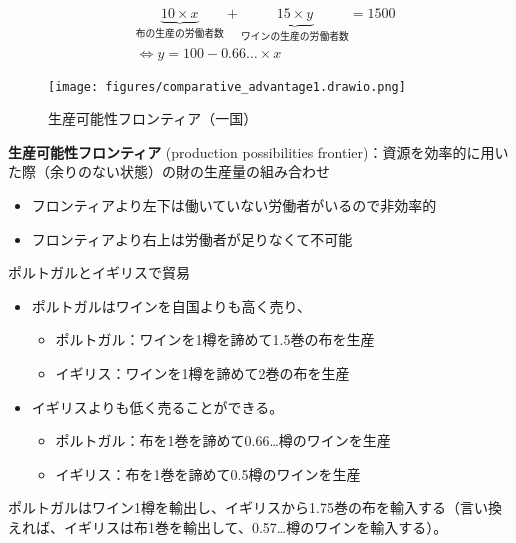 \documentclass[
  xelatex,
  ja=standard]{bxjsarticle}
\providecommand{\tightlist}{%
  \setlength{\itemsep}{0pt}\setlength{\parskip}{0pt}}\usepackage{longtable,booktabs,array}
\begin{document}
\[
\begin{split}
& \underbrace{10 \times x}_{\textrm{布の生産の労働者数}} + \underbrace{15 \times y}_{\textrm{ワインの生産の労働者数}} = 1500 \\
& \Leftrightarrow y = 100 - 0.66 \dots \times x
\end{split}
\]

\begin{figure}[htpb]

{\centering \texttt{[image: figures/comparative\_advantage1.drawio.png]}

}

\caption{生産可能性フロンティア（一国）}

\end{figure}

\textbf{生産可能性フロンティア} (production possibilities
frontier)：資源を効率的に用いた際（余りのない状態）の財の生産量の組み合わせ

\begin{itemize}
\tightlist
\item
  フロンティアより左下は働いていない労働者がいるので非効率的
\item
  フロンティアより右上は労働者が足りなくて不可能
\end{itemize}

ポルトガルとイギリスで貿易

\begin{itemize}
\tightlist
\item
  ポルトガルはワインを自国よりも高く売り、

  \begin{itemize}
  \tightlist
  \item
    ポルトガル：ワインを1樽を諦めて1.5巻の布を生産
  \item
    イギリス：ワインを1樽を諦めて2巻の布を生産
  \end{itemize}
\item
  イギリスよりも低く売ることができる。

  \begin{itemize}
  \tightlist
  \item
    ポルトガル：布を1巻を諦めて0.66\ldots 樽のワインを生産
  \item
    イギリス：布を1巻を諦めて0.5樽のワインを生産
  \end{itemize}
\end{itemize}

\begin{tcolorbox}[enhanced jigsaw, left=2mm, colframe=quarto-callout-tip-color-frame, colback=white, coltitle=black, rightrule=.15mm, title=\textcolor{quarto-callout-tip-color}{\faLightbulb}\hspace{0.5em}{イギリスとポルトガルの貿易'\,'}, arc=.35mm, toprule=.15mm, bottomrule=.15mm, leftrule=.75mm, bottomtitle=1mm, toptitle=1mm, titlerule=0mm, breakable, opacitybacktitle=0.6, colbacktitle=quarto-callout-tip-color!10!white, opacityback=0]

ポルトガルはワイン1樽を輸出し、イギリスから1.75巻の布を輸入する（言い換えれば、イギリスは布1巻を輸出して、0.57\ldots 樽のワインを輸入する）。

\end{tcolorbox}
\end{document}
